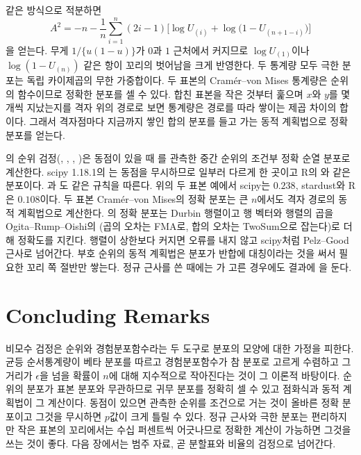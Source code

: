 같은 방식으로 적분하면
\[
A^2=-n-\frac1n\sum_{i=1}^n(2i-1)\bigl[\log U_{(i)}+\log\bigl(1-U_{(n+1-i)}\bigr)\bigr]
\]
을 얻는다. 무게 $1/\{u(1-u)\}$가 $0$과 $1$ 근처에서 커지므로 $\log U_{(1)}$이나 $\log(1-U_{(n)})$ 같은 항이 꼬리의 벗어남을 크게 반영한다. 두 통계량 모두 극한 분포는 독립 카이제곱의 무한 가중합이다. 두 표본의 Cramér--von Mises 통계량은 순위의 함수이므로 정확한 분포를 셀 수 있다\cite{anderson1962}. 합친 표본을 작은 것부터 훑으며 $x$와 $y$를 몇 개씩 지났는지를 격자 위의 경로로 보면 통계량은 경로를 따라 쌓이는 제곱 차이의 합이다. 그래서 격자점마다 지금까지 쌓인 합의 분포를 들고 가는 동적 계획법으로 정확 분포를 얻는다.

\begin{instardust}
의 순위 검정(, , , )은 동점이 있을 때 를 관측한 중간 순위의 조건부 정확 순열 분포로 계산한다. scipy 1.18.1의 는 동점을 무시하므로 일부러 다르게 한 곳이고 R의 와 같은 분포이다. 과 도 같은 규칙을 따른다. 위의 두 표본 예에서 scipy는 $0.238$, stardust와 R은 $0.108$이다. 두 표본 Cramér--von Mises의 정확 분포는 큰 $n$에서도 격자 경로의 동적 계획법으로 계산한다. 의 정확 분포는 Durbin 행렬이고 행 벡터와 행렬의 곱을 Ogita--Rump--Oishi의 (곱의 오차는 FMA로, 합의 오차는 TwoSum으로 잡는다)로 더해 정확도를 지킨다. 행렬이 상한보다 커지면 오류를 내지 않고 scipy처럼 Pelz--Good 근사로 넘어간다. 부호 순위의 동적 계획법은 분포가 반합에 대칭이라는 것을 써서 필요한 꼬리 쪽 절반만 쌓는다. 정규 근사를 쓴 때에는 가 고른 경우에도 결과에 을 둔다.
\end{instardust}

\section{Concluding Remarks}

비모수 검정은 순위와 경험분포함수라는 두 도구로 분포의 모양에 대한 가정을 피한다. 균등 순서통계량이 베타 분포를 따르고 경험분포함수가 참 분포로 고르게 수렴하고 그 거리가 $\epsilon$을 넘을 확률이 $n$에 대해 지수적으로 작아진다는 것이 그 이론적 바탕이다. 순위의 분포가 표본 분포와 무관하므로 귀무 분포를 정확히 셀 수 있고 점화식과 동적 계획법이 그 계산이다. 동점이 있으면 관측한 순위를 조건으로 거는 것이 올바른 정확 분포이고 그것을 무시하면 $p$값이 크게 틀릴 수 있다. 정규 근사와 극한 분포는 편리하지만 작은 표본의 꼬리에서는 수십 퍼센트씩 어긋나므로 정확한 계산이 가능하면 그것을 쓰는 것이 좋다. 다음 장에서는 범주 자료, 곧 분할표와 비율의 검정으로 넘어간다.

\chapterreferences
